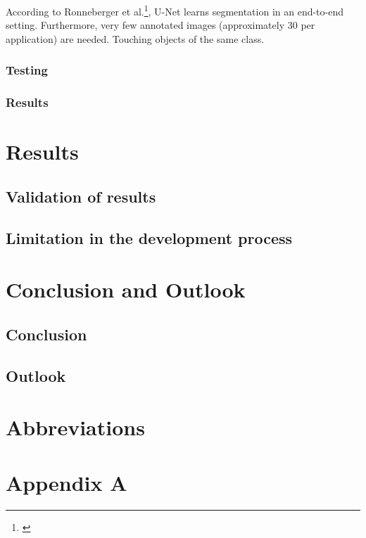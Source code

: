 According to Ronneberger et al.\footnote{\cite{unet_freiburg}}, U-Net learns segmentation in an end-to-end setting. Furthermore, very few annotated images (approximately 30 per application) are needed. Touching objects of the same class.

\subsection{Testing}
\subsection{Results} 

\chapter{Results}
\section{Validation of results}
\section{Limitation in the development process}

\chapter{Conclusion and Outlook}
\section{Conclusion}
\section{Outlook}


\chapter{Abbreviations}


\printbibliography[heading=bibintoc]

\chapter{Appendix A}\label{appendix a}

%


